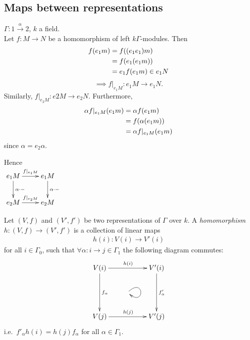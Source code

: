 \subsection{Maps between representations}
\begin{exam}
\(\Gamma\colon 1\xrightarrow{\alpha}2\), \(k\) a field.\\
Let \(f\colon M\xrightarrow{}N\) be a homomorphism of left \(k\Gamma\)-modules. Then
\begin{align}
f(e_1m)  & = f((e_1e_1)m) \notag\\
              & = f(e_1(e_1m)) \notag\\
              & = e_1f(e_1m) \in e_1N\notag
\end{align}
\[\implies f|_{e_1M}:e_1M \to e_1N.\]
Similarly, \(f|_{e_2M}\colon e2M\xrightarrow{}e_2N\). Furthermore,
\begin{align}
     \alpha f|_{e_1M}(e_1m) & = \alpha f(e_1m)\notag\\
                                       & = f(\alpha(e_1m)) \notag\\
                                       & = \alpha f|_{e_1M}(e_1m)\notag
\end{align}
since $\alpha = e_2\alpha$. 
\end{exam}
\noindent Hence\\
\(\xymatrix{e_1M\ar[r]^{f|_{e_1M}}\ar[d]^{\alpha\cdot-} & e_1M\ar[d]^{\alpha\cdot\Large-} \\
e_2M\ar[r]^{f|_{e_2M}} & e_2M}\)
\begin{defin}
Let \((V, f)\) and \((V', f')\) be two representations of \(\Gamma\)
over \(k\). A \emph{homomorphism}
\(h:(V, f)\to  (V', f')\) is a collection of linear maps 
\begin{align*}
    h(i)\colon V(i) \to  V'(i)
\end{align*}
for all \(i\in\Gamma_0\), such that \(\forall\alpha :i\to  j\in\Gamma_1\) the following diagram commutes:
\begin{align*}
  \xymatrix{V(i)\ar[rr]^{h(i)}\ar[dd]^{f_\alpha} & & V'(i)\ar[dd]^{f'_\alpha} \\
 & \ar@(ur,dr) & \\
 V(j)\ar[rr]^{h(j)}& & V'(j)}  
\end{align*}
i.e.\ \(f'_\alpha h(i) = h(j)f_\alpha\) for all \(\alpha\in\Gamma_1\). 
\end{defin}

